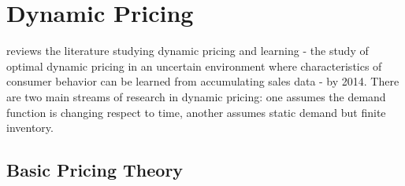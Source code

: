 \documentclass[12pt]{report}
\begin{document}
\clearpage
\section{Dynamic Pricing}

\cite{den2015dynamic} reviews the literature studying dynamic pricing and learning - the study of optimal dynamic pricing in an uncertain environment where characteristics of consumer behavior can be learned from accumulating sales data -
by 2014. There are two main streams of research in dynamic pricing: one assumes the demand function is changing respect to time, another assumes static demand but finite inventory.

\subsection{Basic Pricing Theory}
\end{document}
